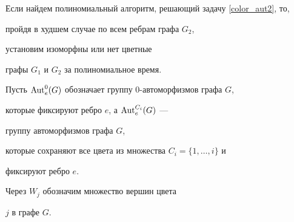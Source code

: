 Если найдем полиномиальный алгоритм, решающий задачу \ref{color_aut2}, то,


пройдя в худшем случае по всем ребрам графа $G_2$,


установим изоморфны или нет цветные


графы $G_1$ и $G_2$ за полиномиальное время.





Пусть $\operatorname{Aut}_e^0 (G)$  обозначает группу $0$-автоморфизмов графа $G$,


которые фиксируют ребро $e$, а $\operatorname{Aut}^{C_i}_e(G)$ ---


группу автоморфизмов графа $G$,


которые сохраняют все цвета из множества $C_i=\{1,\dotsc, i\}$ и


фиксируют ребро $e$.


Через $W_j$ обозначим множество вершин цвета


$j$ в графе $G$.





